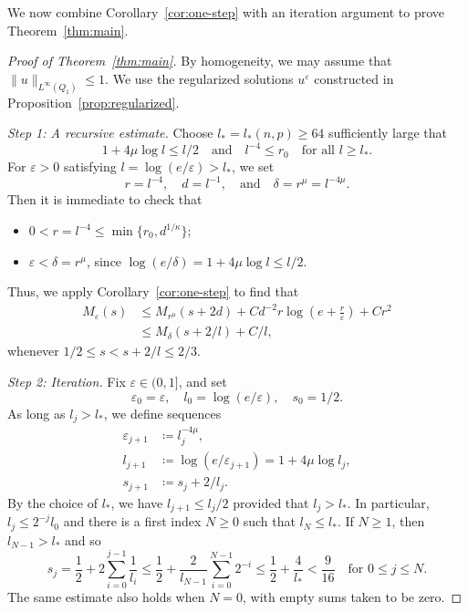 \documentclass[a4paper,11pt]{amsart}
\theoremstyle{plain}
\theoremstyle{definition}
\numberwithin{equation}{section}
\begin{document}
We now combine Corollary~\ref{cor:one-step} with an iteration argument to prove Theorem~\ref{thm:main}.

\begin{proof}[Proof of Theorem~\ref{thm:main}]
By homogeneity, we may assume that $\|u\|_{L^\infty(Q_1)}\leq1$. We use the regularized solutions $u^{\varepsilon}$ constructed in Proposition~\ref{prop:regularized}.

\smallskip\noindent\textit{Step 1: A recursive estimate.}
Choose $l_{\ast}=l_{\ast}(n, p)\geq64$ sufficiently large that
\begin{equation*}
1+4\mu\log l\leq l/2 \quad \text{and} \quad l^{-4}\leq r_0 \quad\text{for all }l\geq l_{\ast}.
\end{equation*}
For $\varepsilon>0$ satisfying $l=\log(e/\varepsilon)>l_{\ast}$, we set
\begin{equation*}
    r=l^{-4},\quad d=l^{-1},\quad\text{and} \quad\delta=r^\mu=l^{-4\mu}.
\end{equation*}
Then it is immediate to check that
\begin{itemize}
    \item $0<r=l^{-4} \leq \min\{r_0, d^{1/\kappa}\}$;

    \item $\varepsilon < \delta=r^{\mu}$, since $\log(e/\delta)=1+4\mu\log l \leq l/2$.
\end{itemize}
Thus, we apply Corollary~\ref{cor:one-step} to find that
\begin{equation}\label{eq:recursive}
\begin{aligned}
    M_\varepsilon(s) &\leq M_{r^\mu}(s+2d)+Cd^{-2}r\log\left(e+\frac r\varepsilon\right)+Cr^2\\
&\leq M_\delta(s+2/l)+C/l,
\end{aligned}
\end{equation}
whenever $1/2\leq s<s+2/l\leq2/3$.

\smallskip\noindent\textit{Step 2: Iteration.}
Fix $\varepsilon\in(0,1]$, and set
\begin{equation*}
\varepsilon_0=\varepsilon,\quad l_0=\log(e/\varepsilon),\quad s_0=1/2.
\end{equation*}
As long as $l_j>l_{\ast}$, we define sequences
\begin{equation*}
\begin{aligned}
\varepsilon_{j+1}&\coloneqq l_j^{-4\mu},\\
l_{j+1}&\coloneqq\log(e/\varepsilon_{j+1})
=1+4\mu\log l_j,\\
s_{j+1}&\coloneqq s_j+2/l_j.
\end{aligned}
\end{equation*}
By the choice of $l_{\ast}$, we have $l_{j+1} \leq l_j/2$ provided that $l_j>l_{\ast}$.
In particular, $l_j\leq2^{-j}l_0$ and there is a first index $N\geq0$ such that $l_N\leq l_{\ast}$. If $N\geq1$, then $l_{N-1}>l_{\ast}$ and so
\begin{equation*}
s_j=\frac{1}{2}+2\sum_{i=0}^{j-1}\frac1{l_i} \leq \frac{1}{2}+\frac{2}{l_{N-1}}\sum_{i=0}^{N-1}2^{-i} \leq \frac{1}{2}+\frac{4}{l_{\ast}}<\frac{9}{16} \quad \text{for $0 \leq j \leq N$}.
\end{equation*}
The same estimate also holds when $N=0$, with empty sums taken to be zero.


\end{proof}
\end{document}
